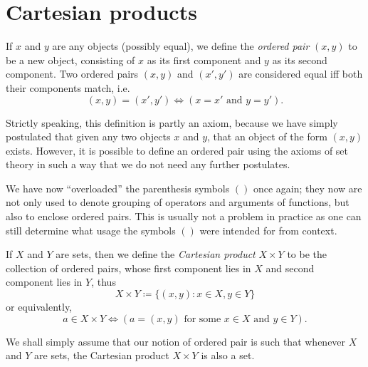 \section{Cartesian products}\label{sec:3.5}

\begin{defn}\label{3.5.1}
  If \(x\) and \(y\) are any objects (possibly equal), we define the \emph{ordered pair} \((x, y)\) to be a new object, consisting of \(x\) as its first component and \(y\) as its second component.
  Two ordered pairs \((x, y)\) and \((x', y')\) are considered equal iff both their components match, i.e.
  \[
    (x, y) = (x', y') \iff (x = x' \text{ and } y = y').
  \]
\end{defn}

\begin{rmk}\label{3.5.2}
  Strictly speaking, this definition is partly an axiom, because we have simply postulated that given any two objects \(x\) and \(y\), that an object of the form \((x, y)\) exists.
  However, it is possible to define an ordered pair using the axioms of set theory in such a way that we do not need any further postulates.
\end{rmk}

\begin{rmk}\label{3.5.3}
  We have now ``overloaded'' the parenthesis symbols \(()\) once again;
  they now are not only used to denote grouping of operators and arguments of functions, but also to enclose ordered pairs.
  This is usually not a problem in practice as one can still determine what usage the symbols \(()\) were intended for from context.
\end{rmk}

\begin{defn}\label{3.5.4}
  If \(X\) and \(Y\) are sets, then we define the \emph{Cartesian product} \(X \times Y\) to be the collection of ordered pairs, whose first component lies in \(X\) and second component lies in \(Y\), thus
  \[
    X \times Y \coloneqq \{(x, y) : x \in X, y \in Y\}
  \]
  or equivalently,
  \[
    a \in X \times Y \iff (a = (x, y) \text{ for some } x \in X \text{ and } y \in Y).
  \]
\end{defn}

\begin{rmk}\label{3.5.5}
  We shall simply assume that our notion of ordered pair is such that whenever \(X\) and \(Y\) are sets, the Cartesian product \(X \times Y\) is also a set.
\end{rmk}

